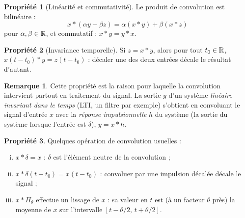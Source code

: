 \documentclass[a4paper,11pt]{article}
\theoremstyle{definition}
\newtheorem{proposition}{Propriété}[section]
\newtheorem{remark}{Remarque}[section]
\newcommand{\highlight}[1]{{\color{niceblue}\emph{#1}}}
\begin{document}
\begin{proposition}[Linéarité et commutativité]
    \label{prop:conv-lineaire}
    Le produit de convolution est bilinéaire : $$x*(\alpha y+\beta z) = \alpha(x*y)+\beta(x*z)$$ pour $\alpha,\beta\in{\mathbb{R}}$, et commutatif : $x*y=y*x$.
\end{proposition}

\begin{proposition}[Invariance temporelle]
    \label{prop:conv-invariance}
    Si $z=x*y$, alors pour tout $t_0\in{\mathbb{R}}$, $x(t-t_0)*y = z(t-t_0)$ : décaler une des deux entrées décale le résultat d'autant.
\end{proposition}

\begin{remark}
    Cette propriété est la raison pour laquelle la convolution intervient partout en traitement du signal. La sortie $y$ d'un système \highlight{linéaire invariant dans le temps} (LTI, un filtre par exemple) s'obtient en convoluant le signal d'entrée $x$ avec la \highlight{réponse impulsionnelle} $h$ du système (la sortie du système lorsque l'entrée est $\delta$), $y=x*h$. 
\end{remark}

\begin{proposition}
    Quelques opération de convolution usuelles :
    \label{prop:conv-porte-dirac}
    \begin{enumerate}[(i)]
        \item $x*\delta = x$ : $\delta$ est l'élément neutre de la convolution ;
        \item $x*\delta(t-t_0) = x(t-t_0)$ : convoluer par une impulsion décalée décale le signal ;
        \item $x*\Pi_\theta$ effectue un lissage de $x$ : sa valeur en $t$ est (à un facteur $\theta$ près) la moyenne de $x$ sur l'intervalle $[t-\theta/2,\,t+\theta/2]$.
    \end{enumerate}
\end{proposition}
\end{document}
